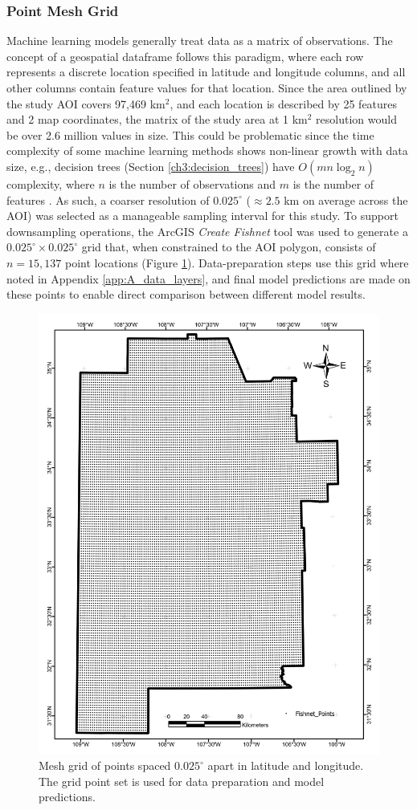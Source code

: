 \subsubsection{Point Mesh Grid}
\label{ch3:meshgrid}
Machine learning models generally treat data as a matrix of observations. The concept of a geospatial dataframe follows this paradigm, where each row represents a discrete location specified in latitude and longitude columns, and all other columns contain feature values for that location. Since the area outlined by the study AOI covers 97,469 km$^2$, and each location is described by 25 features and 2 map coordinates, the matrix of the study area at 1 km$^2$ resolution would be over 2.6 million values in size. This could be problematic since the time complexity of some machine learning methods shows non-linear growth with data size, e.g., decision trees (Section \ref{ch3:decision_trees}) have $O(mn\log_2n)$ complexity, where $n$ is the number of observations and $m$ is the number of features \citep{sani_computational_2018}. As such, a coarser resolution of $0.025^\circ$ ($\approx2.5$ km on average across the AOI) was selected as a manageable sampling interval for this study. To support downsampling operations, the ArcGIS \textit{Create Fishnet} tool was used to generate a $0.025^\circ\times0.025^\circ$ grid that, when constrained to the AOI polygon, consists of $n=15,137$ point locations (Figure \ref{fig:meshgrid}). Data-preparation steps use this grid where noted in Appendix \ref{app:A_data_layers}, and final model predictions are made on these points to enable direct comparison between different model results. 

\begin{figure}
\centering
\includegraphics[width=0.75\linewidth]{templates/images/Figure-Fishnet.pdf}
\caption[Mesh grid point set]{Mesh grid of points spaced $0.025^\circ$ apart in latitude and longitude. The grid point set is used for data preparation and model predictions.} 
\label{fig:meshgrid}
\end{figure}

